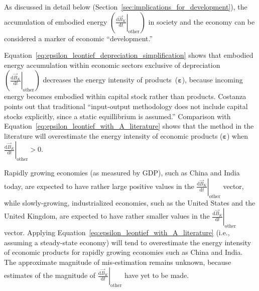 As discussed in detail below (Section~\ref{sec:implications_for_development}),
the accumulation of embodied energy 
$\left( \left. \frac{\mathrm{d}\vec{B}_{K}}{\mathrm{d}t} \right|_{\mathrm{other}} \right)$
in society and the economy
can be considered a marker of economic ``development.''


Equation~\ref{eq:epsilon_leontief_depreciation_simplification} 
shows that embodied energy accumulation within economic sectors 
exclusive of depreciation
$\left( \left. \frac{\mathrm{d}\vec{B}_{K}}{\mathrm{d}t} \right|_{\mathrm{other}} \right)$ 
decreases the energy intensity of products~($\bm{\varepsilon}$),
because incoming energy becomes embodied within capital stock rather than products.
Costanza points out that traditional
``input-output methodology does not include capital stocks explicitly, 
since a static equillibrium is assumed.''\cite{Costanza:1980ww}
Comparison with Equation~\ref{eq:epsilon_leontief_with_A_literature}
shows that the method in the literature will overestimate the energy intensity
of economic products ($\bm{\varepsilon}$) when 
$\left. \frac{\mathrm{d}\vec{B}_{K}}{\mathrm{d}t} \right|_{\mathrm{other}} > 0$.

Rapidly growing economies (as measured by GDP), such as China and India today,
are expected to have rather large positive values in the  
$\left. \frac{\mathrm{d}\vec{B}_{K}}{\mathrm{d}t} \right|_{\mathrm{other}}$ vector,
while slowly-growing, industrialized economies, 
such as the United States and the United Kingdom,
are expected to have rather smaller values in the 
$\left. \frac{\mathrm{d}\vec{B}_{K}}{\mathrm{d}t} \right|_{\mathrm{other}}$ vector.
Applying Equation~\ref{eq:epsilon_leontief_with_A_literature} 
(i.e., assuming a steady-state economy)
will tend to overestimate the energy intensity 
of economic products for rapidly growing economies such as China and India.
The approximate magnitude of mis-estimation remains unknown, because
estimates of the magnitude of
$\left. \frac{\mathrm{d}\vec{B}_{K}}{\mathrm{d}t} \right|_{\mathrm{other}}$
have yet to be made.

